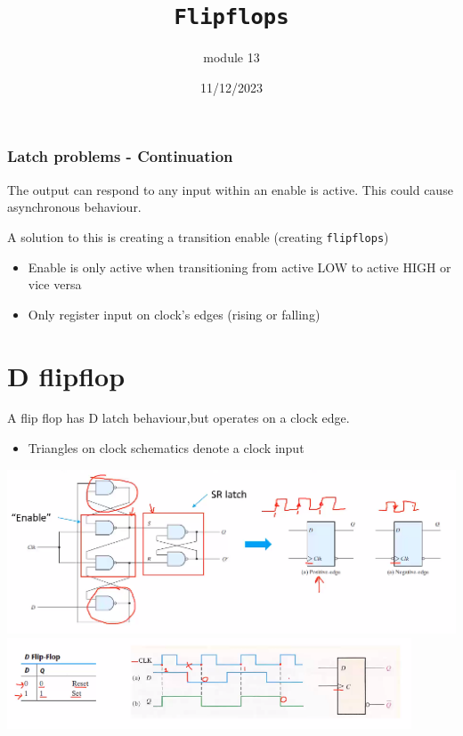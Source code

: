 \documentclass[a4paper,12pt]{article}
\title{\texttt{Flipflops}\\\hrulefill}
\author{module 13}
\date{\small{11/12/2023}}
\begin{document}
    \maketitle

    \subsubsection{Latch problems - Continuation}
        The output can respond to any input within an enable is active. This could cause asynchronous behaviour.\\
        \par A solution to this is creating a transition enable (creating \texttt{flipflops})
        \begin{itemize}
        \item Enable is only active when transitioning from active LOW to active HIGH or vice versa
        \item Only register input on clock's edges (rising or falling)
        \end{itemize}
    \section{D flipflop}
        A flip flop has D latch behaviour,but operates on a clock edge.
        \begin{itemize}
            \item Triangles on clock schematics denote a clock input
        \end{itemize}
        \includegraphics[width=15cm]{DflipflopSchem.png}\\
        \includegraphics[width=12cm]{DflipflopTime.png}
\end{document}
